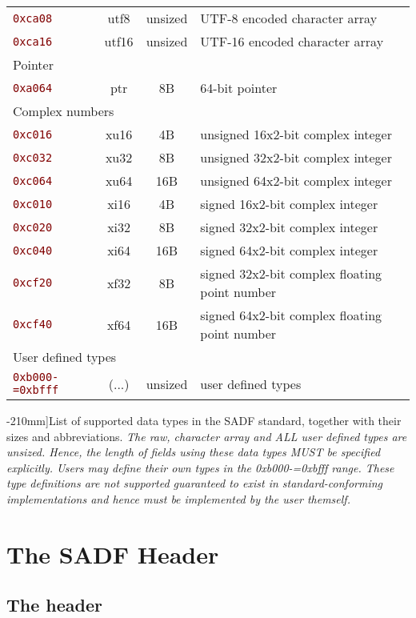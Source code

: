 \documentclass[pagesize=a4]{tufte-book}
\makeatletter
\newcommand{\hlred}[1]{\textcolor{Maroon}{#1}}%
\newcommand{\hex}[1]{\hlred{\texttt{#1}}\label{clsopt:#1}\index{#1 class option@\texttt{#1} class option}\index{class options!#1@\texttt{#1}}}%
\makeatother
\begin{document}
\begin{table*}[ht]
\begin{tabular}{lccl}
		\quad \hex{0xca08} & utf8 & unsized & UTF-8 encoded character array\\
		\quad \hex{0xca16} & utf16 & unsized & UTF-16 encoded character array\\
		\multicolumn{4}{l}{Pointer}\\
		\quad \hex{0xa064} & ptr & 8B & 64-bit pointer\\
		\multicolumn{4}{l}{Complex numbers}\\
		\quad \hex{0xc016} & xu16 & 4B & unsigned 16x2-bit complex integer\\
		\quad \hex{0xc032} & xu32 & 8B & unsigned 32x2-bit complex integer\\
		\quad \hex{0xc064} & xu64 & 16B & unsigned 64x2-bit complex integer\\
		\quad \hex{0xc010} & xi16 & 4B & signed 16x2-bit complex integer\\
		\quad \hex{0xc020} & xi32 & 8B & signed 32x2-bit complex integer\\
		\quad \hex{0xc040} & xi64 & 16B & signed 64x2-bit complex integer\\
		\quad \hex{0xcf20} & xf32 & 8B & signed 32x2-bit complex floating point number\\
		\quad \hex{0xcf40} & xf64 & 16B & signed 64x2-bit complex floating point number\\
		\multicolumn{4}{l}{User defined types}\\
		\quad \hex{0xb000-=0xbfff} & (...) & unsized & user defined types\\
		\bottomrule
	\end{tabular}
	\label{tab:data_type_codes}
	\caption[List of supported data types in the SADF standard, together with
	their sizes and abbreviations.][-210mm]{List of supported data types in the SADF standard, together with their sizes and abbreviations.\emph{ The raw, character array and ALL user defined types are unsized. Hence, the length of fields using these data types MUST be specified explicitly. Users may define their own types in the 0xb000-=0xbfff range. These type definitions are not supported guaranteed to exist in standard-conforming implementations and hence must be implemented by the user themself.}}
\end{table*}

\chapter{The SADF Header}

\section{The header}
\end{document}
